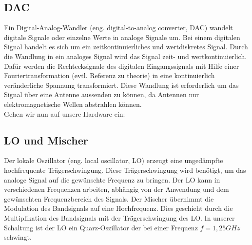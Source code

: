 \subsection{DAC}
Ein Digital-Analog-Wandler (eng. digital-to-analog converter, DAC) wandelt digitale Signale oder einzelne Werte in analoge
Signale um. Bei einem digitalen Signal handelt es sich um ein zeitkontinuierliches und wertdiskretes Signal. Durch die Wandlung
in ein analoges Signal wird das Signal zeit- und wertkontinuierlich.  Dafür werden die Rechtecksignale des digitalen Eingangssignals mit Hilfe einer Fouriertransformation (evtl. Referenz zu theorie)
in eine  kontinuierlich veränderliche Spannung transformiert. Diese Wandlung ist erforderlich um das Signal über eine
Antenne aussenden zu können, da Antennen nur elektromagnetische Wellen abstrahlen können. \\
Gehen wir nun auf unsere Hardware ein:
\\

\subsection{LO und Mischer}
Der lokale Oszillator (eng. local oscillator, LO) erzeugt eine ungedämpfte hochfrequente Trägerschwingung. Diese Trägerschwingung
wird benötigt, um das analoge Signal auf die gewünschte Frequenz zu bringen. Der LO kann in verschiedenen Frequenzen arbeiten,
abhängig von der Anwendung und dem gewünschten Frequenzbereich des Signals. Der Mischer übernimmt die Modulation des
Bandsignals auf eine Hochfrequenz. Dies geschieht durch die Multiplikation des Bandsignals mit der Trägerschwingung des LO.
In unserer Schaltung ist der LO ein Quarz-Oszillator der bei einer Frequenz $f=1,25GHz$ schwingt.


